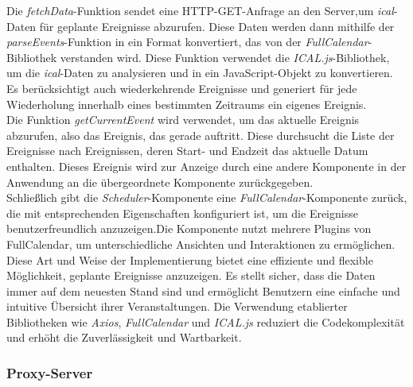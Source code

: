 Die \emph{fetchData}-Funktion sendet eine HTTP-GET-Anfrage an den Server,um \emph{ical}-Daten für geplante Ereignisse abzurufen. Diese Daten werden dann mithilfe der \emph{parseEvents}-Funktion in ein Format konvertiert, das von der \emph{FullCalendar}-Bibliothek verstanden wird. Diese Funktion verwendet die \emph{ICAL.js}-Bibliothek, um die \emph{ical}-Daten zu analysieren und in ein JavaScript-Objekt zu konvertieren. Es berücksichtigt auch wiederkehrende Ereignisse und generiert für jede Wiederholung innerhalb eines bestimmten Zeitraums ein eigenes Ereignis.\\
Die Funktion \emph{getCurrentEvent} wird verwendet, um das aktuelle Ereignis abzurufen, also das Ereignis, das gerade auftritt. Diese durchsucht die Liste der Ereignisse nach Ereignissen, deren Start- und Endzeit das aktuelle Datum enthalten. Dieses Ereignis wird zur Anzeige durch eine andere Komponente in der Anwendung an die übergeordnete Komponente zurückgegeben.\\
Schließlich gibt die \emph{Scheduler}-Komponente eine \emph{FullCalendar}-Komponente zurück, die mit  entsprechenden Eigenschaften konfiguriert ist, um die Ereignisse benutzerfreundlich anzuzeigen.Die Komponente nutzt mehrere Plugins von FullCalendar, um unterschiedliche Ansichten und Interaktionen zu ermöglichen.\\
Diese Art und Weise der Implementierung bietet eine effiziente und flexible Möglichkeit, geplante Ereignisse anzuzeigen. Es stellt sicher, dass die Daten immer auf dem neuesten Stand sind und ermöglicht Benutzern eine einfache und intuitive Übersicht ihrer Veranstaltungen. Die Verwendung etablierter Bibliotheken wie \emph{Axios}, \emph{FullCalendar} und \emph{ICAL.js} reduziert die Codekomplexität und erhöht die Zuverlässigkeit und Wartbarkeit.
\subsubsection{Proxy-Server}


